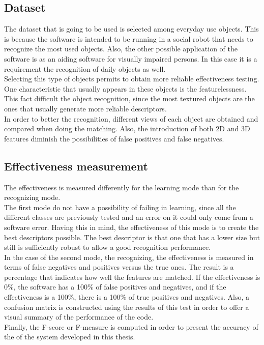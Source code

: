 	\subsection{Dataset}
		The dataset that is going to be used is selected among everyday use objects. This is because the software is intended to be running in a social robot that needs to recognize the most used objects. Also, the other possible application of the software is as an aiding software for visually impaired persons. In this case it is a requirement the recognition of daily objects as well.  
		\\

		Selecting this type of objects permits to obtain more reliable effectiveness testing. One characteristic that usually appears in these objects is the featurelessness. This fact difficult the object recognition, since the most textured objects are the ones that usually generate more reliable descriptors. \\

		In order to better the recognition, different views of each object are obtained and compared when doing the matching. Also, the introduction of both 2D and 3D features diminish the possibilities of false positives and false negatives. \\[0.5cm]

	\subsection{Effectiveness measurement}

		The effectiveness is measured differently for the learning mode than for the recognizing mode. 
		\\

		The first mode do not have a possibility of failing in learning, since all the different classes are previously tested and an error on it could only come from a software error. Having this in mind, the effectiveness of this mode is to create the best descriptors possible. 
		The best descriptor is that one that has a lower size but still is sufficiently robust to allow a good recognition performance. 
		\\

		In the case of the second mode, the recognizing, the effectiveness is measured in terms of false negatives and positives versus the true ones. The result is a percentage that indicates how well the features are matched. If the effectiveness is 0\%, the software has a 100\% of false positives and negatives, and if the effectiveness is a 100\%, there is a 100\% of true positives and negatives. 
		Also, a confusion matrix is constructed using the results of this test in order to offer a visual summary of the performance of the code. 	\\

		Finally, the F-score or F-measure is computed in order to present the accuracy of the of the system developed in this thesis. 

		
